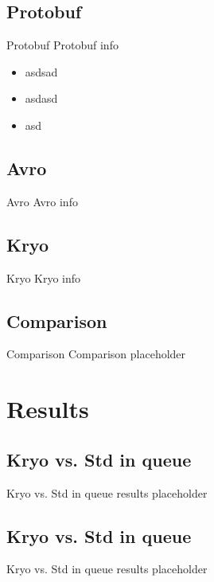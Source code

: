 \documentclass[8pt]{beamer}
\begin{document}
\renewcommand{\partname}{Protobuf}
\subsection{\partname}
\begin{frame}{\partname}
  Protobuf info
  \begin{itemize}
    \item asdsad
    \item asdasd
    \item asd
  \end{itemize}
\end{frame}

\renewcommand{\partname}{Avro}
\subsection{\partname}
\begin{frame}{\partname}
  Avro info
\end{frame}

\renewcommand{\partname}{Kryo}
\subsection{\partname}
\begin{frame}{\partname}
  Kryo info
\end{frame}

\renewcommand{\partname}{Comparison}
\subsection{\partname}
\begin{frame}{\partname}
  Comparison placeholder
\end{frame}

\section{Results}
\renewcommand{\partname}{Kryo vs. Std in queue}
\subsection{\partname}
\begin{frame}{\partname}
  results placeholder
\end{frame}

\renewcommand{\partname}{Kryo vs. Std in queue}
\subsection{\partname}
\begin{frame}{\partname}
  results placeholder
\end{frame}
\end{document}
